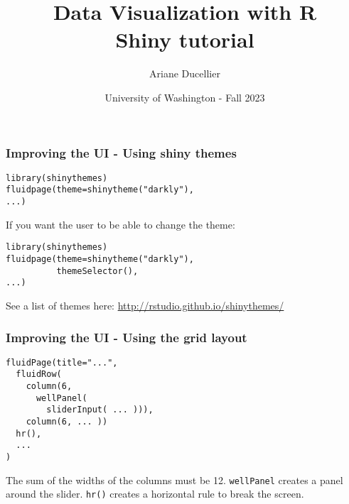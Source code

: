 \documentclass{beamer}
\title[Data Visualization with R - Shiny tutorial]{Data Visualization with R \\ Shiny tutorial}
\author{Ariane Ducellier}
\date{University of Washington - Fall 2023}
\begin{document}
	\begin{frame}
		\titlepage
	\end{frame}

	\begin{frame}[fragile]
		\frametitle{Improving the UI - Using shiny themes}
		
		\begin{exampleblock}{}
		\begin{BVerbatim}
library(shinythemes)
fluidpage(theme=shinytheme("darkly"),
...)
		\end{BVerbatim}
		\end{exampleblock}{}

		\vspace{2em}

		If you want the user to be able to change the theme:
		
		\begin{exampleblock}{}
		\begin{BVerbatim}
library(shinythemes)
fluidpage(theme=shinytheme("darkly"),
          themeSelector(),
...)
		\end{BVerbatim}
		\end{exampleblock}{}

		\vspace{2em}

		See a list of themes here: \href{http://rstudio.github.io/shinythemes/}{http://rstudio.github.io/shinythemes/}
 	
	\end{frame}

	\begin{frame}[fragile]
		\frametitle{Improving the UI - Using the grid layout}
		
		\begin{exampleblock}{}
		\begin{BVerbatim}
fluidPage(title="...",
  fluidRow(
    column(6,
      wellPanel(
        sliderInput( ... ))),
    column(6, ... ))
  hr(),
  ...
)      
		\end{BVerbatim}
		\end{exampleblock}{}

		\vspace{1em}

		The sum of the  widths of the columns must be 12. \verb|wellPanel| creates a panel around the slider. \verb|hr()| creates a horizontal rule to break the screen.

	\end{frame}
\end{document}
